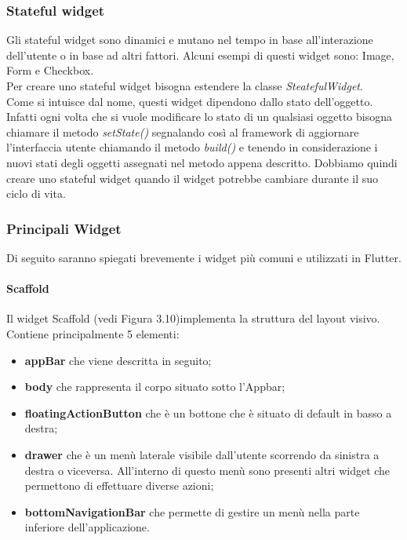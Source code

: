 \subsubsection{Stateful widget}
Gli stateful widget sono dinamici e mutano nel tempo in base all'interazione dell'utente o in base ad altri fattori.
Alcuni esempi di questi widget sono: Image, Form e Checkbox.\\
Per creare uno stateful widget bisogna estendere la classe \textit{SteatefulWidget}.\\
Come si intuisce dal nome, questi widget dipendono dallo stato dell'oggetto. Infatti ogni volta che si vuole modificare lo stato di un qualsiasi oggetto bisogna chiamare il metodo \textit{setState()} segnalando così al framework di aggiornare l'interfaccia utente chiamando il metodo \textit{build()} e tenendo in considerazione i nuovi stati degli oggetti assegnati nel metodo appena descritto. 
Dobbiamo quindi creare uno stateful widget quando il widget potrebbe cambiare durante il suo ciclo di vita. 

\newpage

\subsubsection{Principali Widget}
Di seguito saranno spiegati brevemente i widget più comuni e utilizzati in Flutter.

\paragraph{Scaffold}
Il widget Scaffold \cite{scaffold} (vedi Figura 3.10)implementa la struttura del layout visivo.\\
Contiene principalmente 5 elementi:
\begin{itemize}
	\item \textbf{appBar} che viene descritta in seguito;   
	\item \textbf{body} che rappresenta il corpo situato sotto l'Appbar;
	\item \textbf{floatingActionButton} che è un bottone che è situato di default in basso a destra;   
	\item \textbf{drawer} che è un menù laterale visibile dall'utente scorrendo da sinistra a destra o viceversa. All'interno di questo menù sono presenti altri widget che permettono di effettuare diverse azioni;
	\item \textbf{bottomNavigationBar} che permette di gestire un menù nella parte inferiore dell'applicazione.
\end{itemize}

